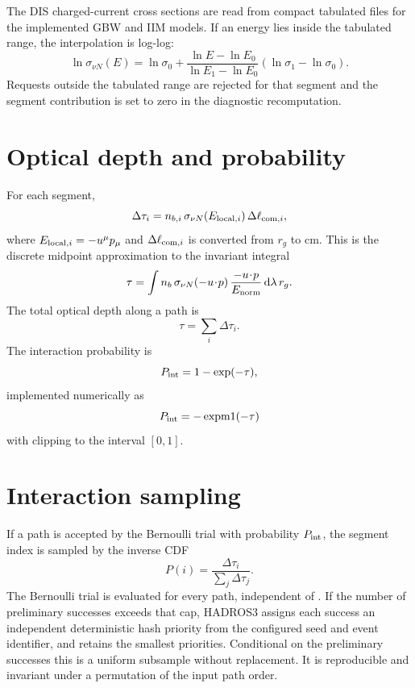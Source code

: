 \documentclass[11pt,a4paper]{report}
\numberwithin{equation}{chapter}
\newcommand{\code}[1]{\texttt{\detokenize{#1}}}
\newcommand{\rg}{r_g}
\newcommand{\dd}{\mathrm{d}}
\newcommand{\sigmanun}{\sigma_{\nu N}}
\begin{document}
The DIS charged-current cross sections are read from compact tabulated files
for the implemented GBW and IIM models. If an energy lies inside the tabulated
range, the interpolation is log-log:
\begin{equation}
\ln \sigmanun(E)
=
\ln \sigma_0
+
\frac{\ln E-\ln E_0}{\ln E_1-\ln E_0}
\left(\ln\sigma_1-\ln\sigma_0\right).
\end{equation}
Requests outside the tabulated range are rejected for that segment and the
segment contribution is set to zero in the diagnostic recomputation.

\section{Optical depth and probability}

For each segment,
\begin{equation}
\Delta\tau_i =
n_{b,i}\,\sigmanun(E_{{\rm local},i})\,
\Delta \ell_{{\rm com},i},
\end{equation}
where $E_{{\rm local},i}=-u^\mu p_\mu$ and
$\Delta\ell_{{\rm com},i}$ is converted from $\rg$ to cm. This is the discrete
midpoint approximation to the invariant integral
\begin{equation}
\tau=\int n_b\,\sigmanun(-u\!\cdot\!p)\,
\frac{-u\!\cdot\!p}{E_{\rm norm}}\,\dd\lambda\,r_g.
\end{equation}
The total optical depth along a path is
\begin{equation}
\tau = \sum_i \Delta\tau_i.
\end{equation}
The interaction probability is
\begin{equation}
P_{\rm int}=1-\exp(-\tau),
\end{equation}
implemented numerically as
\begin{equation}
P_{\rm int}=-\operatorname{expm1}(-\tau)
\end{equation}
with clipping to the interval $[0,1]$.

\section{Interaction sampling}

If a path is accepted by the Bernoulli trial with probability $P_{\rm int}$,
the segment index is sampled by the inverse CDF
\begin{equation}
P(i)=\frac{\Delta\tau_i}{\sum_j \Delta\tau_j}.
\end{equation}
The Bernoulli trial is evaluated for every path, independent of
\code{max_interactions}. If the number of preliminary successes exceeds that
cap, HADROS3 assigns each success an independent deterministic hash priority
from the configured seed and event identifier, and retains the smallest
priorities. Conditional on the preliminary successes this is a uniform
subsample without replacement. It is reproducible and invariant under a
permutation of the input path order.
\end{document}
